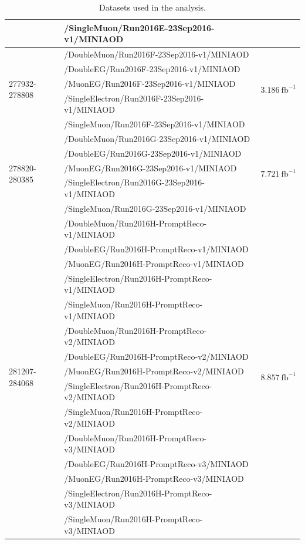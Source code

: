 \begin{table}[h]
\begin{tabular}{|l|l|l|}
& /SingleMuon/Run2016E-23Sep2016-v1/MINIAOD &  \\
\hline
\multirow{5}{*}{277932-278808} & /DoubleMuon/Run2016F-23Sep2016-v1/MINIAOD &  \multirow{5}{*}{$3.186\ \text{fb}^{-1}$} \\
& /DoubleEG/Run2016F-23Sep2016-v1/MINIAOD &  \\
& /MuonEG/Run2016F-23Sep2016-v1/MINIAOD &  \\
& /SingleElectron/Run2016F-23Sep2016-v1/MINIAOD &  \\
& /SingleMuon/Run2016F-23Sep2016-v1/MINIAOD &  \\
\hline
\multirow{5}{*}{278820-280385} & /DoubleMuon/Run2016G-23Sep2016-v1/MINIAOD &  \multirow{5}{*}{$7.721\ \text{fb}^{-1}$} \\
& /DoubleEG/Run2016G-23Sep2016-v1/MINIAOD &  \\
& /MuonEG/Run2016G-23Sep2016-v1/MINIAOD &  \\
& /SingleElectron/Run2016G-23Sep2016-v1/MINIAOD &  \\
& /SingleMuon/Run2016G-23Sep2016-v1/MINIAOD &  \\
\hline
\multirow{15}{*}{281207-284068} & /DoubleMuon/Run2016H-PromptReco-v1/MINIAOD &  \multirow{15}{*}{$8.857\ \text{fb}^{-1}$} \\
& /DoubleEG/Run2016H-PromptReco-v1/MINIAOD &  \\
& /MuonEG/Run2016H-PromptReco-v1/MINIAOD &  \\
& /SingleElectron/Run2016H-PromptReco-v1/MINIAOD &  \\
& /SingleMuon/Run2016H-PromptReco-v1/MINIAOD &  \\
& /DoubleMuon/Run2016H-PromptReco-v2/MINIAOD &  \\
& /DoubleEG/Run2016H-PromptReco-v2/MINIAOD &  \\
& /MuonEG/Run2016H-PromptReco-v2/MINIAOD &  \\
& /SingleElectron/Run2016H-PromptReco-v2/MINIAOD &  \\
& /SingleMuon/Run2016H-PromptReco-v2/MINIAOD &  \\
& /DoubleMuon/Run2016H-PromptReco-v3/MINIAOD &  \\
& /DoubleEG/Run2016H-PromptReco-v3/MINIAOD &  \\
& /MuonEG/Run2016H-PromptReco-v3/MINIAOD &  \\
& /SingleElectron/Run2016H-PromptReco-v3/MINIAOD &  \\
& /SingleMuon/Run2016H-PromptReco-v3/MINIAOD &  \\
\hline %
\hline %
     \end{tabular}
\small
    \caption{ Datasets used in the analysis. }
    \label{tab:datasets_data}
\end{table}


